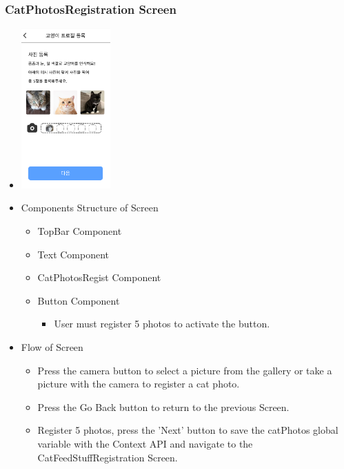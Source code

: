 \documentclass[conference]{IEEEtran}
\begin{document}
\subsubsection{CatPhotosRegistration Screen}
\begin{itemize}
    \item[] \includegraphics[width=0.27\textwidth]{img/D/12.png}
    \item Components Structure of Screen
    \begin{itemize}
        \item TopBar Component
        \item Text Component
        \item CatPhotosRegist Component
        \item Button Component
        \begin{itemize}
            \item User must register 5 photos to activate the button.
        \end{itemize}
    \end{itemize}
    \item Flow of Screen
    \begin{itemize}
        \item Press the camera button to select a picture from the gallery or take a picture with the camera to register a cat photo.
        \item Press the Go Back button to return to the previous Screen.
        \item Register 5 photos, press the 'Next' button to save the catPhotos global variable with the Context API and navigate to the CatFeedStuffRegistration Screen.
    \end{itemize}
\end{itemize}
\newpage
\end{document}
